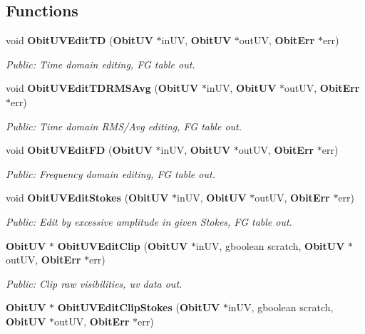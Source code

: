 \subsection*{Functions}
\begin{CompactItemize}
\item 
void {\bf Obit\-UVEdit\-TD} ({\bf Obit\-UV} $\ast$in\-UV, {\bf Obit\-UV} $\ast$out\-UV, {\bf Obit\-Err} $\ast$err)
\begin{CompactList}\small\item\em Public: Time domain editing, FG table out. \item\end{CompactList}\item 
void {\bf Obit\-UVEdit\-TDRMSAvg} ({\bf Obit\-UV} $\ast$in\-UV, {\bf Obit\-UV} $\ast$out\-UV, {\bf Obit\-Err} $\ast$err)
\begin{CompactList}\small\item\em Public: Time domain RMS/Avg editing, FG table out. \item\end{CompactList}\item 
void {\bf Obit\-UVEdit\-FD} ({\bf Obit\-UV} $\ast$in\-UV, {\bf Obit\-UV} $\ast$out\-UV, {\bf Obit\-Err} $\ast$err)
\begin{CompactList}\small\item\em Public: Frequency domain editing, FG table out. \item\end{CompactList}\item 
void {\bf Obit\-UVEdit\-Stokes} ({\bf Obit\-UV} $\ast$in\-UV, {\bf Obit\-UV} $\ast$out\-UV, {\bf Obit\-Err} $\ast$err)
\begin{CompactList}\small\item\em Public: Edit by excessive amplitude in given Stokes, FG table out. \item\end{CompactList}\item 
{\bf Obit\-UV} $\ast$ {\bf Obit\-UVEdit\-Clip} ({\bf Obit\-UV} $\ast$in\-UV, gboolean scratch, {\bf Obit\-UV} $\ast$out\-UV, {\bf Obit\-Err} $\ast$err)
\begin{CompactList}\small\item\em Public: Clip raw visibilities, uv data out. \item\end{CompactList}\item 
{\bf Obit\-UV} $\ast$ {\bf Obit\-UVEdit\-Clip\-Stokes} ({\bf Obit\-UV} $\ast$in\-UV, gboolean scratch, {\bf Obit\-UV} $\ast$out\-UV, {\bf Obit\-Err} $\ast$err)

\end{CompactItemize}
